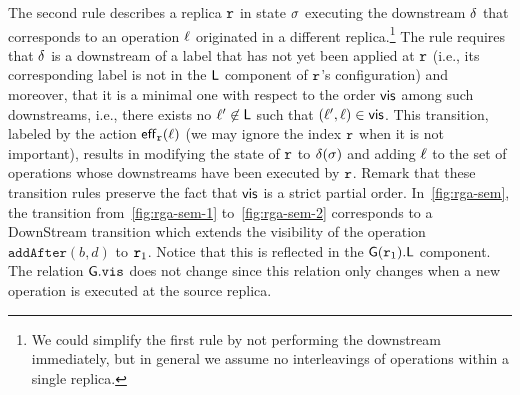 The second rule describes a replica $\mathtt{r}$ in state $\sigma$
executing the downstream $\delta$ that corresponds to an operation
$\ell$ originated in a different replica.\footnote{We could
  simplify the first rule by not performing the downstream immediately,
  but in general we assume no interleavings of operations within a
  single replica.}
The rule requires that $\delta$ is a downstream of a label that has
not yet been applied at $\mathtt{r}$ (i.e., its corresponding label is not
in the $\mathsf{L}$ component of $\mathtt{r}$'s configuration) and
moreover, that it is a minimal one with respect to the order
$\mathsf{vis}$ among such downstreams, i.e., there exists no
$\ell'\not\in \mathsf{L}$ such that $(\ell',\ell)\in
\mathsf{vis}$.
This transition, labeled by the action $\mathsf{eff}_{\mathtt{r}}(\ell)$ (we may
ignore the index $\mathtt{r}$ when it is not important), results in
modifying the state of $\mathtt{r}$ to $\delta(\sigma)$ and adding
$\ell$ to the set of operations whose downstreams have been
executed by $\mathtt{r}$.
Remark that these transition rules preserve the fact that $\mathsf{vis}$
is a strict partial order.
%
In~\autoref{fig:rga-sem}, the transition from~\autoref{fig:rga-sem-1}
to~\autoref{fig:rga-sem-2} corresponds to a {\sc DownStream}
transition which extends the visibility of the operation
$\mathtt{addAfter}(b, d)$ to $\mathtt{r}_1$.
%
Notice that this is reflected in the $\mathsf{G}(\mathtt{r}_1).\mathsf{L}$
component.
%
The relation $\mathsf{G}.\mathtt{vis}$ does not change since this
relation only changes when a new operation is executed at the source
replica.



